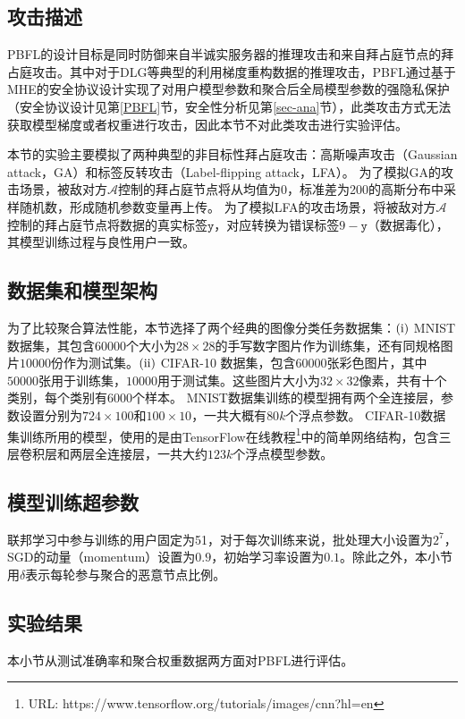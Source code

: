 \subsection{攻击描述}
PBFL的设计目标是同时防御来自半诚实服务器的推理攻击和来自拜占庭节点的拜占庭攻击。其中对于DLG等典型的利用梯度重构数据的推理攻击\cite{zhu2019deep, geiping2020inverting}，PBFL通过基于MHE的安全协议设计实现了对用户模型参数和聚合后全局模型参数的强隐私保护（安全协议设计见第\ref{PBFL}节，安全性分析见第\ref{sec-ana}节），此类攻击方式无法获取模型梯度或者权重进行攻击，因此本节不对此类攻击进行实验评估。

本节的实验主要模拟了两种典型的非目标性拜占庭攻击：高斯噪声攻击（Gaussian attack，GA）和标签反转攻击（Label-flipping attack，LFA）。
为了模拟GA的攻击场景，被敌对方$\mathcal{A}$控制的拜占庭节点将从均值为0，标准差为200的高斯分布中采样随机数，形成随机参数变量再上传。
为了模拟LFA的攻击场景，将被敌对方$\mathcal{A}$控制的拜占庭节点将数据的真实标签$\mathtt{y}$，对应转换为错误标签$9-\mathtt{y}$（数据毒化），其模型训练过程与良性用户一致。

\subsection{数据集和模型架构}
为了比较聚合算法性能，本节选择了两个经典的图像分类任务数据集：$(\rm \romannumeral1)$ MNIST 数据集，其包含$ 60000 $个大小为$28 \times 28$的手写数字图片作为训练集，还有同规格图片$10000$份作为测试集。$(\rm \romannumeral2)$ CIFAR-10 数据集，包含$60000$张彩色图片，其中$50000$张用于训练集，$10000$用于测试集。这些图片大小为$32\times 32$像素，共有十个类别，每个类别有$6000$个样本。
MNIST数据集训练的模型拥有两个全连接层，参数设置分别为$724 \times 100$和$100 \times 10$，一共大概有$80k$个浮点参数。
CIFAR-10数据集训练所用的模型，使用的是由TensorFlow在线教程\footnote{URL: https://www.tensorflow.org/tutorials/images/cnn?hl=en}中的简单网络结构，包含三层卷积层和两层全连接层，一共大约$123k$个浮点模型参数。

\subsection{模型训练超参数}
联邦学习中参与训练的用户固定为51，对于每次训练来说，批处理大小设置为$2^7$，SGD的动量（momentum）设置为$0.9$，初始学习率设置为$0.1$。除此之外，本小节用$\delta$表示每轮参与聚合的恶意节点比例。

\subsection{实验结果}
本小节从测试准确率和聚合权重数据两方面对PBFL进行评估。

